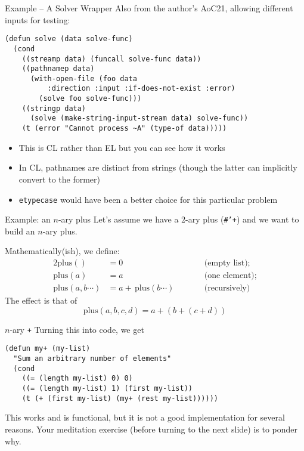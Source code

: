 \documentclass[presentation]{beamer}
\begin{document}
\begin{frame}[fragile]{Example -- A Solver Wrapper}
Also from the author's AoC21, allowing different inputs for testing:
\begin{verbatim}
(defun solve (data solve-func)
  (cond
    ((streamp data) (funcall solve-func data))
    ((pathnamep data)
      (with-open-file (foo data
          :direction :input :if-does-not-exist :error)
        (solve foo solve-func)))
    ((stringp data)
      (solve (make-string-input-stream data) solve-func))
    (t (error "Cannot process ~A" (type-of data)))))
\end{verbatim}
\begin{itemize}
\item This is CL rather than EL but you can see how it works
\item In CL, pathnames are distinct from strings (though the latter can implicitly convert to the former)
\item \texttt{etypecase} would have been a better choice for this particular problem
\end{itemize}

\end{frame}

\begin{frame}{Example: an $n$-ary plus}
Let's assume we have a $2$-ary plus (\texttt{\#'+}) and we want to build an $n$-ary plus.

\medskip
Mathematically(ish), we define:
\begin{alignat*}{2}
  \mathrm{plus}() &= 0 && \qquad \text{(empty list);} \\
  \mathrm{plus}(a) & = a && \qquad \text{(one element);} \\
  \mathrm{plus}(a,b \cdots) &= a+\, \mathrm{plus}(b \cdots) && \qquad \text{(recursively)}
\end{alignat*}
The effect is that of
$$\mathrm{plus}(a,b,c,d)=a+(b+(c+d))$$
\end{frame}
\begin{frame}[fragile]{$n$-ary \texttt{+}}
Turning this into code, we get
\begin{verbatim}
(defun my+ (my-list)
  "Sum an arbitrary number of elements"
  (cond
    ((= (length my-list) 0) 0)
    ((= (length my-list) 1) (first my-list))
    (t (+ (first my-list) (my+ (rest my-list))))))
\end{verbatim}

\medskip
This works and is functional, but it is not a good implementation for several reasons.  Your meditation exercise (before turning to the next slide) is to ponder why.
\end{frame}
\end{document}
